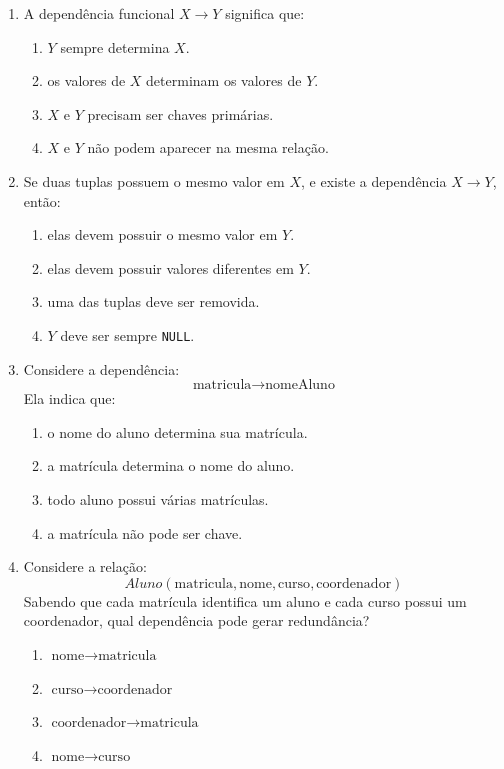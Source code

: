 \documentclass[12pt,a4paper]{article}
\begin{document}
\begin{enumerate}[label=\textbf{Q\arabic*.}]
\item A dependência funcional $X \rightarrow Y$ significa que:

\begin{enumerate}[label=\alph*)]
    \item $Y$ sempre determina $X$.
    \item os valores de $X$ determinam os valores de $Y$.
    \item $X$ e $Y$ precisam ser chaves primárias.
    \item $X$ e $Y$ não podem aparecer na mesma relação.
\end{enumerate}

\item Se duas tuplas possuem o mesmo valor em $X$, e existe a dependência $X \rightarrow Y$, então:

\begin{enumerate}[label=\alph*)]
    \item elas devem possuir o mesmo valor em $Y$.
    \item elas devem possuir valores diferentes em $Y$.
    \item uma das tuplas deve ser removida.
    \item $Y$ deve ser sempre \texttt{NULL}.
\end{enumerate}

\item Considere a dependência:
\[
\text{matricula} \rightarrow \text{nomeAluno}
\]
Ela indica que:

\begin{enumerate}[label=\alph*)]
    \item o nome do aluno determina sua matrícula.
    \item a matrícula determina o nome do aluno.
    \item todo aluno possui várias matrículas.
    \item a matrícula não pode ser chave.
\end{enumerate}

\item Considere a relação:
\[
Aluno(\text{matricula}, \text{nome}, \text{curso}, \text{coordenador})
\]
Sabendo que cada matrícula identifica um aluno e cada curso possui um coordenador, qual dependência pode gerar redundância?

\begin{enumerate}[label=\alph*)]
    \item $\text{nome} \rightarrow \text{matricula}$
    \item $\text{curso} \rightarrow \text{coordenador}$
    \item $\text{coordenador} \rightarrow \text{matricula}$
    \item $\text{nome} \rightarrow \text{curso}$
\end{enumerate}


\end{enumerate}
\end{document}
